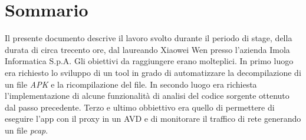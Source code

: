 
\cleardoublepage
{}
{}
\begingroup
\let\clearpage\relax
\let\cleardoublepage\relax
\let\cleardoublepage\relax

\chapter*{Sommario}

Il presente documento descrive il lavoro svolto durante il periodo di stage, della durata di circa trecento ore, dal laureando Xiaowei Wen presso l'azienda Imola Informatica S.p.A. Gli obiettivi da raggiungere erano molteplici. In primo luogo era richiesto lo sviluppo di un tool in grado di automatizzare la decompilazione di un file \textit{APK} e la ricompilazione del file. In secondo luogo era richiesta l'implementazione di alcune funzionalità di analisi del codice sorgente ottenuto dal passo precedente.
Terzo e ultimo obbiettivo era quello di permettere di eseguire l'app con il proxy in un AVD e di monitorare il traffico di rete generando un file \textit{pcap}.

%
%

\endgroup			

\vfill

